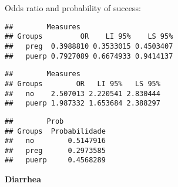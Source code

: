 \documentclass[
]{article}
\newenvironment{Shaded}{\begin{snugshade}}{\end{snugshade}}
\newcommand{\CommentTok}[1]{\textcolor[rgb]{0.56,0.35,0.01}{\textit{#1}}}
\newcommand{\KeywordTok}[1]{\textcolor[rgb]{0.13,0.29,0.53}{\textbf{#1}}}
\newcommand{\NormalTok}[1]{#1}
\newcommand{\OperatorTok}[1]{\textcolor[rgb]{0.81,0.36,0.00}{\textbf{#1}}}
\begin{document}
Odds ratio and probability of success:

\begin{Shaded}
\end{Shaded}

\begin{verbatim}
##        Measures
## Groups         OR    LI 95%    LS 95%
##   preg  0.3988810 0.3533015 0.4503407
##   puerp 0.7927089 0.6674933 0.9414137
\end{verbatim}

\begin{Shaded}
\end{Shaded}

\begin{verbatim}
##        Measures
## Groups        OR   LI 95%   LS 95%
##   no    2.507013 2.220541 2.830444
##   puerp 1.987332 1.653684 2.388297
\end{verbatim}

\begin{Shaded}
\end{Shaded}

\begin{verbatim}
##        Prob
## Groups  Probabilidade
##   no        0.5147916
##   preg      0.2973585
##   puerp     0.4568289
\end{verbatim}

\textbf{Diarrhea}
\end{document}
